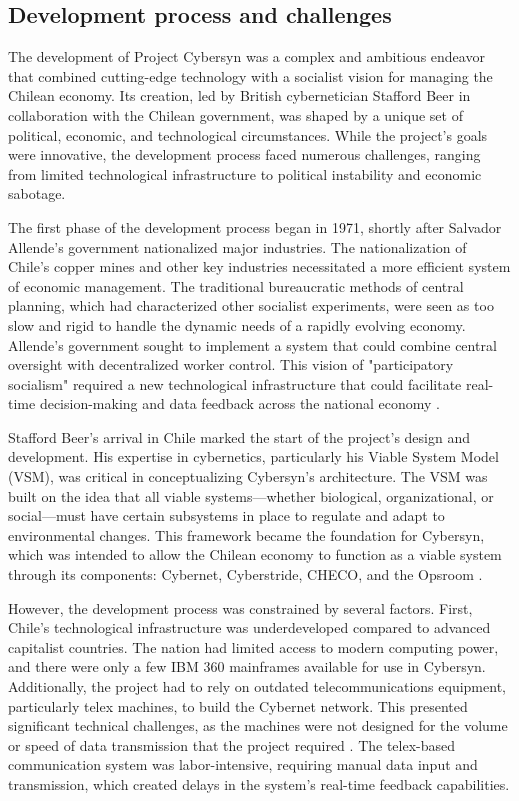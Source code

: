 \begin{refsection}
\subsection{Development process and challenges}

The development of Project Cybersyn was a complex and ambitious endeavor that combined cutting-edge technology with a socialist vision for managing the Chilean economy. Its creation, led by British cybernetician Stafford Beer in collaboration with the Chilean government, was shaped by a unique set of political, economic, and technological circumstances. While the project's goals were innovative, the development process faced numerous challenges, ranging from limited technological infrastructure to political instability and economic sabotage.

The first phase of the development process began in 1971, shortly after Salvador Allende's government nationalized major industries. The nationalization of Chile's copper mines and other key industries necessitated a more efficient system of economic management. The traditional bureaucratic methods of central planning, which had characterized other socialist experiments, were seen as too slow and rigid to handle the dynamic needs of a rapidly evolving economy. Allende's government sought to implement a system that could combine central oversight with decentralized worker control. This vision of "participatory socialism" required a new technological infrastructure that could facilitate real-time decision-making and data feedback across the national economy \cite[pp.~112-116]{medina2011}.

Stafford Beer's arrival in Chile marked the start of the project’s design and development. His expertise in cybernetics, particularly his Viable System Model (VSM), was critical in conceptualizing Cybersyn’s architecture. The VSM was built on the idea that all viable systems—whether biological, organizational, or social—must have certain subsystems in place to regulate and adapt to environmental changes. This framework became the foundation for Cybersyn, which was intended to allow the Chilean economy to function as a viable system through its components: Cybernet, Cyberstride, CHECO, and the Opsroom \cite[pp.~98-101]{beer1994}. 

However, the development process was constrained by several factors. First, Chile’s technological infrastructure was underdeveloped compared to advanced capitalist countries. The nation had limited access to modern computing power, and there were only a few IBM 360 mainframes available for use in Cybersyn. Additionally, the project had to rely on outdated telecommunications equipment, particularly telex machines, to build the Cybernet network. This presented significant technical challenges, as the machines were not designed for the volume or speed of data transmission that the project required \cite[pp.~125-128]{medina2014}. The telex-based communication system was labor-intensive, requiring manual data input and transmission, which created delays in the system’s real-time feedback capabilities.


\end{refsection}
